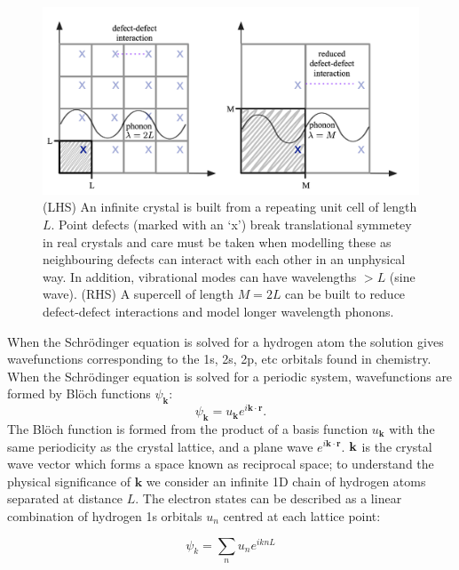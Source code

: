 \begin{figure}[h]
\centering
  \includegraphics[width=0.8\columnwidth]{figures/ch3/supercell.png}
  \caption[Translational symmetry and supercell construction]{(LHS) An infinite crystal is built from a repeating unit cell of length $L$. Point defects (marked with an `x') break translational symmetey in real crystals and care must be taken when modelling these as neighbouring defects can interact with each other in an unphysical way. In addition, vibrational modes can have wavelengths $>L$ (sine wave). (RHS) A supercell of length $M=2L$ can be built to reduce defect-defect interactions and model longer wavelength phonons. } 
  \label{translational}
\end{figure}

When the Schr\"{o}dinger equation is solved for a hydrogen atom the solution gives wavefunctions corresponding to the 1s, 2s, 2p, etc orbitals found in chemistry. When the Schr\"{o}dinger equation is solved for a periodic system, wavefunctions are formed by Bl\"{o}ch functions $\psi_{\textbf{k}}$:\autocite{Hoffmann1987}
\begin{equation} \label{bloch}
\psi_{\textbf{k}} = u_\textbf{k}e^{i\textbf{k}\cdot\textbf{r}}.
\end{equation}   %
The Bl\"{o}ch function is formed from the product of a basis function $u_\textbf{k}$ with the same periodicity as the crystal lattice, and a plane wave $e^{i\textbf{k}\cdot\textbf{r}}$. $\textbf k$ is the crystal wave vector which forms a space known as reciprocal space; to understand the physical significance of $\textbf{k}$ we consider an infinite 1D chain of hydrogen atoms separated at distance $L$. The electron states can be described as a linear combination of hydrogen 1s orbitals $u_n$ centred at each lattice point:

\begin{equation} \label{1dbloch}
\psi_k = \sum_nu_ne^{iknL}
\end{equation}

